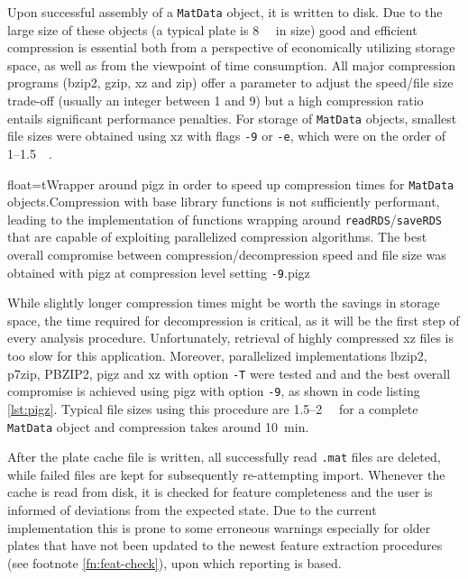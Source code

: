 Upon successful assembly of a \texttt{MatData} object, it is written to disk. Due to the large size of these objects (a typical plate is \tilde \SI{8}{\giga\byte} in size) good and efficient compression is essential both from a perspective of economically utilizing storage space, as well as from the viewpoint of time consumption. All major compression programs (bzip2, gzip, xz and zip) offer a parameter to adjust the speed\slash file size trade-off (usually an integer between 1 and 9) but a high compression ratio entails significant performance penalties. For storage of \texttt{MatData} objects, smallest file sizes were obtained using xz with flags \texttt{-9} or \texttt{-e}, which were on the order of 1--\SI{1.5}{\giga\byte}.

\begin{rlisting}{float=t}{Wrapper around pigz in order to speed up compression times for \texttt{MatData} objects.}{Compression with base library functions is not sufficiently performant, leading to the implementation of functions wrapping around \texttt{readRDS}\slash\texttt{saveRDS} that are capable of exploiting parallelized compression algorithms. The best overall compromise between compression\slash decompression speed and file size was obtained with pigz at compression level setting \texttt{-9}.}{pigz}

\end{rlisting}

While slightly longer compression times might be worth the savings in storage space, the time required for decompression is critical, as it will be the first step of every analysis procedure. Unfortunately, retrieval of highly compressed xz files is too slow for this application. Moreover, parallelized implementations lbzip2, p7zip, PBZIP2, pigz and xz with option \texttt{-T} were tested and and the best overall compromise is achieved using pigz with option \texttt{-9}, as shown in code listing \ref{lst:pigz}. Typical file sizes using this procedure are 1.5--\SI{2}{\giga\byte} for a complete \texttt{MatData} object and compression takes around \SI{10}{\minute}.

After the plate cache file is written, all successfully read \texttt{.mat} files are deleted, while failed files are kept for subsequently re-attempting import. Whenever the cache is read from disk, it is checked for feature completeness and the user is informed of deviations from the expected state. Due to the current implementation this is prone to some erroneous warnings especially for older plates that have not been updated to the newest feature extraction procedures (see footnote \ref{fn:feat-check}), upon which reporting is based.

